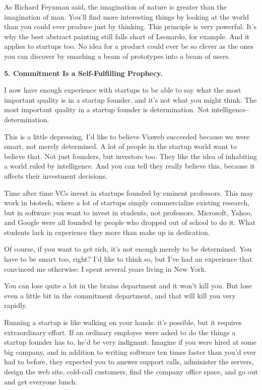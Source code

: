 As Richard Feynman said, the imagination of nature is greater than
the imagination of man.  You'll find more interesting things by
looking at the world than you could ever produce just by thinking.
This principle is very powerful.  It's why the best abstract painting
still falls short of Leonardo, for example.  And it applies to
startups too.  No idea for a product could ever be so clever as the
ones you can discover by smashing a beam of prototypes into a beam
of users.


\textbf{5. Commitment Is a Self-Fulfilling Prophecy.}

I now have enough experience with startups to be able to say what
the most important quality is in a startup founder, and it's not
what you might think.  The most important quality in a startup
founder is determination.  Not intelligence-- determination.

This is a little depressing.  I'd like to believe Viaweb succeeded
because we were smart, not merely determined.  A lot of people in
the startup world want to believe that.  Not just founders, but
investors too.  They like the idea of inhabiting a world ruled by
intelligence.  And you can tell they really believe this, because
it affects their investment decisions.

Time after time VCs invest in startups founded by eminent professors.
This may work in biotech, where a lot of startups simply commercialize
existing research, but in software you want to invest in students,
not professors.  Microsoft, Yahoo, and Google were all founded by
people who dropped out of school to do it.  What students lack in
experience they more than make up in dedication.

Of course, if you want to get rich, it's not enough merely to be
determined.  You have to be smart too, right?  I'd like to think
so, but I've had an experience that convinced me otherwise: I spent
several years living in New York.

You can lose quite a lot in the brains department and it won't kill
you.  But lose even a little bit in the commitment department, and
that will kill you very rapidly.

Running a startup is like walking on your hands: it's possible, but
it requires extraordinary effort.  If an ordinary employee were
asked to do the things a startup founder has to, he'd be very
indignant.  Imagine if you were hired at some big company, and in
addition to writing software ten times faster than you'd ever had
to before, they expected you to answer support calls, administer
the servers, design the web site, cold-call customers, find the
company office space, and go out and get everyone lunch.

